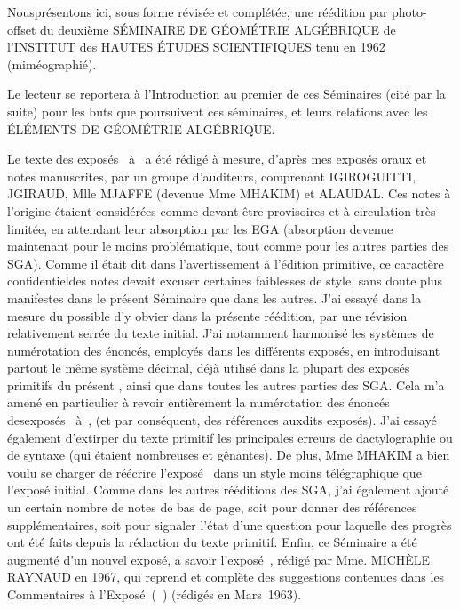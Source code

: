 Nous\pageoriginale pr\'esentons ici, sous forme r\'evis\'ee et compl\'et\'ee, une r\'e\'edition par photo-offset du deuxi\`eme S\'EMINAIRE DE G\'{E}OM\'{E}TRIE ALG\'EBRIQUE de l'INSTITUT des HAUTES \'ETUDES SCIENTIFIQUES tenu en 1962 (mim\'eographi\'e).

Le lecteur se reportera \`a l'Introduction au premier de ces S\'eminaires (cit\'e  par la suite) pour les buts que poursuivent ces s\'eminaires, et leurs relations avec les \'EL\'EMENTS DE G\'{E}OM\'{E}TRIE ALG\'EBRIQUE.

Le texte des expos\'es~ \`a~ a \'et\'e r\'edig\'e \`a mesure, d'apr\`es mes expos\'es oraux et notes manuscrites, par un groupe d'auditeurs, comprenant I\ptbl GIROGUITTI, J\ptbl GIRAUD, Mlle M\ptbl JAFFE (devenue Mme M\ptbl HAKIM) et A\ptbl LAUDAL. Ces notes \`a l'origine \'etaient consid\'er\'ees comme devant \^etre provisoires et \`a circulation tr\`es limit\'ee, en attendant leur absorption par les EGA (absorption devenue maintenant pour le moins probl\'ematique, tout comme pour les autres parties des SGA). Comme il \'etait dit dans l'avertissement \`a l'\'edition primitive, ce caract\`ere \og confidentiel\fg des notes devait excuser certaines \og faiblesses de style\fg, sans doute plus manifestes dans le pr\'esent S\'eminaire  que dans les autres. J'ai essay\'e dans la mesure du possible d'y obvier dans la pr\'esente r\'e\'edition, par une r\'evision relativement serr\'ee du texte initial. J'ai notamment harmonis\'e les syst\`emes de num\'erotation des \'enonc\'es, employ\'es dans les diff\'erents expos\'es, en introduisant partout le m\^eme syst\`eme d\'ecimal, d\'ej\`a utilis\'e dans la plupart des expos\'es primitifs du pr\'esent , ainsi que dans toutes les autres parties des SGA. Cela m'a amen\'e en particulier \`a revoir enti\`erement la num\'erotation des \'enonc\'es des\pageoriginale expos\'es~ \`a~, (et par cons\'equent, des r\'ef\'erences auxdits expos\'es). J'ai essay\'e \'egalement d'extirper du texte primitif les principales erreurs de dactylographie ou de syntaxe (qui \'etaient nombreuses et g\^enantes). De plus, Mme M\ptbl HAKIM a bien voulu se charger de r\'e\'ecrire l'expos\'e~ dans un style moins t\'el\'egraphique que l'expos\'e initial. Comme dans les autres r\'e\'editions des SGA, j'ai \'egalement ajout\'e un certain nombre de notes de bas de page, soit pour donner des r\'ef\'erences suppl\'ementaires, soit pour signaler l'\'etat d'une question pour laquelle des progr\`es ont \'et\'e faits depuis la r\'edaction du texte primitif. Enfin, ce S\'eminaire a \'et\'e augment\'e d'un nouvel expos\'e, a savoir l'expos\'e~, r\'edig\'e par Mme. MICH\`ELE RAYNAUD en 1967, qui reprend et compl\`ete des suggestions contenues dans les \og Commentaires \`a l'Expos\'e~\fg (~) (r\'edig\'es en Mars~1963). 